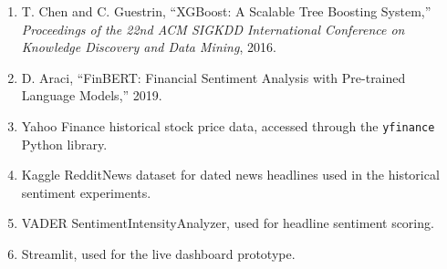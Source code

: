 \documentclass[11pt]{article}
\begin{document}
\begin{enumerate}
    \item T. Chen and C. Guestrin, ``XGBoost: A Scalable Tree Boosting System,'' \textit{Proceedings of the 22nd ACM SIGKDD International Conference on Knowledge Discovery and Data Mining}, 2016.
    \item D. Araci, ``FinBERT: Financial Sentiment Analysis with Pre-trained Language Models,'' 2019.
    \item Yahoo Finance historical stock price data, accessed through the \texttt{yfinance} Python library.
    \item Kaggle RedditNews dataset for dated news headlines used in the historical sentiment experiments.
    \item VADER SentimentIntensityAnalyzer, used for headline sentiment scoring.
    \item Streamlit, used for the live dashboard prototype.
\end{enumerate}
\end{document}
